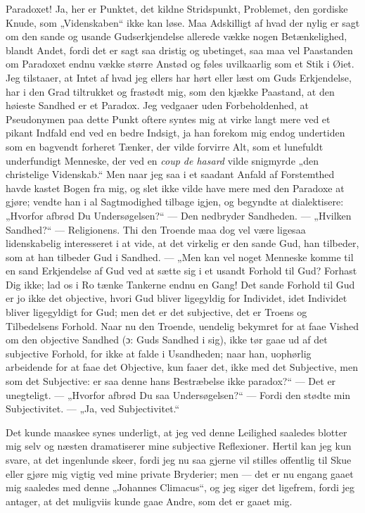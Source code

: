 Paradoxet! Ja, her er Punktet, det kildne Stridspunkt, Problemet,
den gordiske Knude, som „Videnskaben“ ikke kan løse. Maa
Adskilligt af hvad der nylig er sagt om den sande og usande
Gudserkjendelse allerede vække nogen Betænkelighed, blandt Andet,
fordi det er sagt saa dristig og ubetinget, saa maa vel Paastanden
om Paradoxet endnu vække større Anstød og føles uvilkaarlig som et
Stik i Øiet. Jeg tilstaaer, at Intet af hvad jeg ellers har hørt
eller læst om Guds Erkjendelse, har i den Grad tiltrukket og
frastødt mig, som den kjække Paastand, at den høieste Sandhed er
et Paradox. Jeg vedgaaer uden Forbeholdenhed, at Pseudonymen paa
dette Punkt oftere syntes mig at virke langt mere ved et pikant
Indfald end ved en bedre Indsigt, ja han forekom mig endog
undertiden som en bagvendt forheret Tænker, der vilde forvirre
Alt, som et lunefuldt underfundigt Menneske, der ved en
\textit{coup de hasard} vilde snigmyrde „den christelige
Videnskab.“ Men naar jeg saa i et saadant Anfald af Forstemthed
havde kastet Bogen fra mig, og slet ikke vilde have mere med den
Paradoxe at gjøre; vendte han i al Sagtmodighed tilbage igjen, og
begyndte at dialektisere: „Hvorfor afbrød Du Undersøgelsen?“ ---
Den nedbryder Sandheden. --- „Hvilken Sandhed?“ --- Religionens.
Thi den Troende maa dog vel være ligesaa lidenskabelig interesseret
i at vide, at det virkelig er den sande Gud, han tilbeder, som at
han tilbeder Gud i Sandhed. ---
 „Men kan vel noget Menneske komme til en sand Erkjendelse af Gud
ved at sætte sig i et usandt Forhold til Gud? Forhast Dig ikke;
lad os i Ro tænke Tankerne endnu en Gang! Det sande Forhold til
Gud er jo ikke det objective, hvori Gud bliver ligegyldig for
Individet, idet Individet bliver ligegyldigt for Gud; men det er
det subjective, det er Troens og Tilbedelsens Forhold. Naar nu den
Troende, uendelig bekymret for at faae Vished om den objective
Sandhed (ɔ: Guds Sandhed i sig), ikke tør gaae ud af det
subjective Forhold, for ikke at falde i Usandheden; naar han,
uophørlig arbeidende for at faae det Objective, kun faaer det,
ikke med det Subjective, men som det Subjective: er saa denne hans
Bestræbelse ikke paradox?“ --- Det er unegteligt. --- „Hvorfor
afbrød Du saa Undersøgelsen?“ --- Fordi den stødte min
Subjectivitet. --- „Ja, ved Subjectivitet.“

Det kunde maaskee synes underligt, at jeg ved denne Leilighed
saaledes blotter mig selv og næsten dramatiserer mine subjective
Reflexioner. Hertil kan jeg kun svare, at det ingenlunde skeer,
fordi jeg nu saa gjerne vil stilles offentlig til Skue eller gjøre
mig vigtig ved mine private Bryderier; men --- det er nu engang
gaaet mig saaledes med denne „Johannes Climacus“, og jeg siger det
ligefrem, fordi jeg antager, at det muligviis kunde gaae Andre,
som det er gaaet mig.

